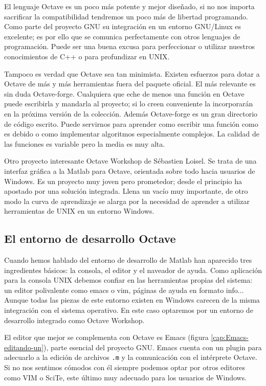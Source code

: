 El lenguaje Octave es un poco más potente y mejor diseñado, si no nos
importa sacrificar la compatibilidad tendremos un poco más de libertad
programando.  Como parte del proyecto GNU su integración en un entorno
GNU/Linux es excelente; es por ello que se comunica perfectamente con
otros lenguajes de programación.  Puede ser una buena excusa para
perfeccionar o utilizar nuestros conocimientos de C++ o para
profundizar en UNIX.

Tampoco es verdad que Octave sea tan minimista. Existen esfuerzos para
dotar a Octave de más y más herramientas fuera del paquete oficial.
El más relevante es sin duda Octave-forge. Cualquiera que eche de
menos una función en Octave puede escribirla y mandarla al proyecto;
si lo creen conveniente la incorporarán en la próxima versión de la
colección. Además Octave-forge es un gran directorio de código
escrito. Puede servirnos para aprender como escribir una función como
es debido o como implementar algoritmos especialmente complejos. La
calidad de las funciones es variable pero la media es muy alta.

Otro proyecto interesante Octave Workshop de Sébastien Loisel.  Se
trata de una interfaz gráfica a la Matlab para Octave, orientada sobre
todo hacia usuarios de Windows.  Es un proyecto muy joven pero
prometedor; desde el principio ha apostado por una solución integrada.
Llena un vacío muy importante, de otro modo la curva de aprendizaje se
alarga por la necesidad de aprender a utilizar herramientas de UNIX en
un entorno Windows.

\subsection{El entorno de desarrollo Octave}

Cuando hemos hablado del entorno de desarrollo de Matlab han aparecido
tres ingredientes básicos: la consola, el editor y el naveador de
ayuda.  Como aplicación para la consola UNIX debemos confiar en las
herramientas propias del sistema: un editor polivalente como emacs o
vim, páginas de ayuda en formato info...  Aunque todas las piezas de
este entorno existen en Windows carecen de la misma integración con el
sistema operativo.  En este caso optaremos por un entorno de
desarrollo integrado como Octave Workshop.

El editor que mejor se complementa con Octave es Emacs (figura
\ref{cap:Emacs-editando-un}), parte esencial del proyecto GNU. Emacs
cuenta con un plugin para adecuarlo a la edición de archivos
\texttt{.m} y la comunicación con el intérprete Octave. Si no nos
sentimos cómodos con él siempre podemos optar por otros editores como
VIM o SciTe, este último muy adecuado para los usuarios de Windows.

